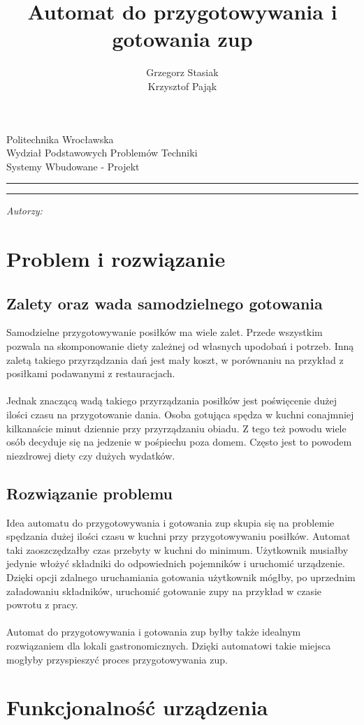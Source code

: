 \documentclass[12pt,a4paper,notitlepage]{report}
\author{Grzegorz Stasiak\\Krzysztof Pająk}
\title{Automat do przygotowywania i gotowania zup}
\makeatletter
\newcommand{\linia}{\rule{\linewidth}{0.4mm}}
\renewcommand{\maketitle}{\begin{titlepage}
    \vspace*{1cm}
    \begin{center}\small
    Politechnika Wrocławska\\
    Wydział Podstawowych Problemów Techniki\\
    Systemy Wbudowane - Projekt
    \end{center}
    \vspace{3cm}
    \noindent\linia
    \begin{center}
      \LARGE \textsc{\@title}
         \end{center}
     \linia
    \vspace{0.5cm}
    \begin{flushright}
    \begin{minipage}{5cm}
    \textit{\small Autorzy:}\\
    \normalsize \textsc{\@author} \par
    \end{minipage}
    \vspace{5cm}
     \end{flushright}
    \vspace*{\stretch{6}}
    \begin{center}
    \@date
    \end{center}
  \end{titlepage}
}
\makeatother
\begin{document}
\maketitle
\tableofcontents
\newpage

\section{Problem i rozwiązanie}
\subsection{Zalety oraz wada samodzielnego gotowania}
Samodzielne przygotowywanie posiłków ma wiele zalet. Przede wszystkim pozwala na skomponowanie diety zależnej od własnych upodobań i potrzeb. Inną zaletą takiego przyrządzania dań jest mały koszt, w porównaniu na przykład z posiłkami podawanymi z restauracjach.\\ \\
Jednak znaczącą wadą takiego przyrządzania posiłków jest poświęcenie dużej ilości czasu na przygotowanie dania. Osoba gotująca spędza w kuchni conajmniej kilkanaście minut dziennie przy przyrządzaniu obiadu. Z tego też powodu wiele osób decyduje się na jedzenie w pośpiechu poza domem. Często jest to powodem niezdrowej diety czy dużych wydatków.

\subsection{Rozwiązanie problemu}
Idea automatu do przygotowywania i gotowania zup skupia się na problemie spędzania dużej ilości czasu w kuchni przy przygotowywaniu posiłków. Automat taki zaoszczędzałby czas przebyty w kuchni do minimum. Użytkownik musiałby jedynie włożyć składniki do odpowiednich pojemników i uruchomić urządzenie. Dzięki opcji zdalnego uruchamiania gotowania użytkownik mógłby, po uprzednim załadowaniu składników, uruchomić gotowanie zupy na przykład w czasie powrotu z pracy.\\ \\
Automat do przygotowywania i gotowania zup byłby także idealnym rozwiązaniem dla lokali gastronomicznych. Dzięki automatowi takie miejsca mogłyby przyspieszyć proces przygotowywania zup. 

\section{Funkcjonalność urządzenia}
\end{document}
